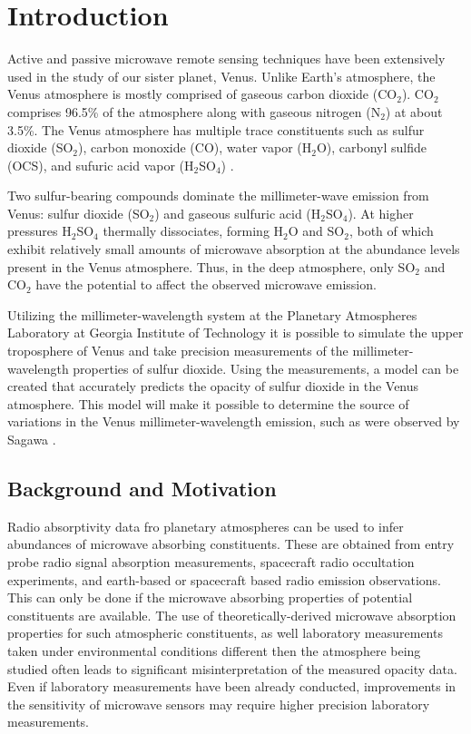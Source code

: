 \chapter{Introduction}

Active and passive microwave remote sensing techniques have been extensively used in the study of our sister planet, Venus. Unlike Earth's atmosphere, the Venus atmosphere is mostly comprised of gaseous carbon dioxide (CO$_2$). CO$_2$ comprises 96.5\% of the atmosphere along with gaseous nitrogen (N$_2$) at about 3.5\%. The Venus atmosphere has multiple trace constituents such as sulfur dioxide (SO$_2$), carbon monoxide (CO), water vapor (H$_2$O), carbonyl sulfide (OCS), and sufuric acid vapor (H$_2$SO$_4$) \cite{Suleiman-thesis}.

Two sulfur-bearing compounds dominate the millimeter-wave emission from Venus: sulfur dioxide (SO$_2$) and gaseous sulfuric acid (H$_2$SO$_4$). At higher pressures H$_2$SO$_4$ thermally dissociates, forming H$_2$O and SO$_2$, both of which exhibit relatively small amounts of microwave absorption at the abundance levels present in the Venus atmosphere. Thus, in the deep atmosphere, only SO$_2$ and CO$_2$ have the potential to affect the observed microwave emission.

Utilizing the millimeter-wavelength system at the Planetary Atmospheres Laboratory at Georgia Institute of Technology it is possible to simulate the upper troposphere of Venus and take precision measurements of the millimeter-wavelength properties of sulfur dioxide. Using the measurements, a model can be created that accurately predicts the opacity of sulfur dioxide in the Venus atmosphere. This model will make it possible to determine the source of variations in the Venus millimeter-wavelength emission, such as were observed by Sagawa \cite{Sagawa-2008}.

\section{Background and Motivation}

Radio absorptivity data fro planetary atmospheres can be used to infer abundances of microwave absorbing constituents. These are obtained from entry probe radio signal absorption measurements, spacecraft radio occultation experiments, and earth-based or spacecraft based radio emission observations. This can only be done if the microwave absorbing properties of potential constituents are available. The use of theoretically-derived microwave absorption properties for such atmospheric constituents, as well laboratory measurements taken under environmental conditions different then the atmosphere being studied often leads to significant misinterpretation of the measured opacity data. Even if laboratory measurements have been already conducted, improvements in the sensitivity of microwave sensors may require higher precision laboratory measurements. 


